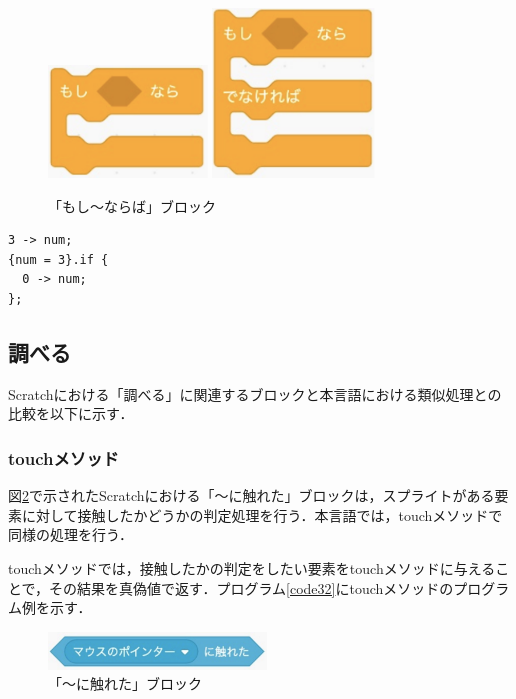 \documentclass[10pt,a4j]{ltjsarticle}
\begin{document}
\begin{figure}[H]
  \centering
  \includegraphics[height=30mm]{images/if.pdf}
  \includegraphics[height=45mm]{images/if2.pdf} 
  \caption{「もし〜ならば」ブロック}
  \label{fig:if}
\end{figure}

\begin{lstlisting}[caption=ifメソッドのプログラム例, label=code31]
3 -> num;
{num = 3}.if { 
  0 -> num;
};
\end{lstlisting}

\subsection{調べる}
Scratchにおける「調べる」に関連するブロックと本言語における類似処理との比較を以下に示す．
\subsubsection{touchメソッド}
図\ref{fig:touch}で示されたScratchにおける「〜に触れた」ブロックは，スプライトがある要素に対して接触したかどうかの判定処理を行う．本言語では，touchメソッドで同様の処理を行う．

touchメソッドでは，接触したかの判定をしたい要素をtouchメソッドに与えることで，その結果を真偽値で返す．プログラム\ref{code32}にtouchメソッドのプログラム例を示す．
\begin{figure}[H]
  \centering
  \includegraphics[height=10mm]{images/touch.pdf}
  \caption{「〜に触れた」ブロック}
  \label{fig:touch}
\end{figure}
\end{document}
